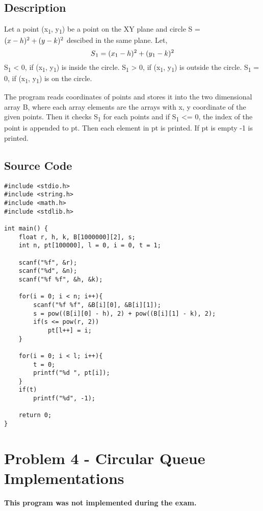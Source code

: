 \documentclass{article}
\begin{document}
\subsection{Description}
Let a point (x\textsubscript{1}, y\textsubscript{1}) be a point on the XY plane and circle S = \( (x - h)\textsuperscript{2} + (y - k)\textsuperscript{2} \) descibed in the same plane. 
Let,
\[S\textsubscript{1} = (x\textsubscript{1} - h)\textsuperscript{2} + (y\textsubscript{1} - k)\textsuperscript{2} \]
S\textsubscript{1} < 0, if (x\textsubscript{1}, y\textsubscript{1}) is inside the circle.\newline
S\textsubscript{1} > 0, if (x\textsubscript{1}, y\textsubscript{1}) is outside the circle.\newline
S\textsubscript{1} = 0, if (x\textsubscript{1}, y\textsubscript{1}) is on the circle.

The program reads coordinates of points and stores it into the two dimensional array B, where each array elements are the arrays with x, y coordinate of the given points. Then it checks S\textsubscript{1} for each points and if S\textsubscript{1} <= 0, the index of the point is appended to pt. Then each element in pt is printed. If pt is empty -1 is printed.
\subsection{Source Code}
\begin{verbatim}
#include <stdio.h>
#include <string.h>
#include <math.h>
#include <stdlib.h>

int main() {
    float r, h, k, B[1000000][2], s;
    int n, pt[100000], l = 0, i = 0, t = 1;

    scanf("%f", &r);
    scanf("%d", &n);
    scanf("%f %f", &h, &k);

    for(i = 0; i < n; i++){
        scanf("%f %f", &B[i][0], &B[i][1]);
        s = pow((B[i][0] - h), 2) + pow((B[i][1] - k), 2);
        if(s <= pow(r, 2))
            pt[l++] = i;
    }

    for(i = 0; i < l; i++){
        t = 0;
        printf("%d ", pt[i]);
    }
    if(t)
        printf("%d", -1);

    return 0;
}
\end{verbatim}
\newpage
\section{Problem 4 - Circular Queue Implementations}
\textbf{This program was not implemented during the exam.}
\end{document}
